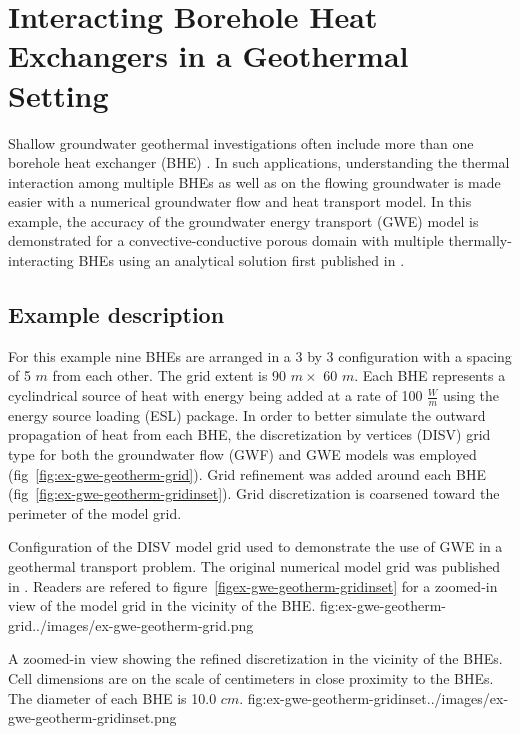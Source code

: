\section{Interacting Borehole Heat Exchangers in a Geothermal Setting}

Shallow groundwater geothermal investigations often include more than one borehole heat exchanger (BHE) \cite{hechtMendez2010}. In such applications, understanding the thermal interaction among multiple BHEs as well as on the flowing groundwater is made easier with a numerical groundwater flow and heat transport model.  In this example, the accuracy of the groundwater energy transport (GWE) model is demonstrated for a convective-conductive porous domain with multiple thermally-interacting BHEs using an analytical solution first published in \citep{alKhoury2021}.  

\subsection{Example description}

For this example nine BHEs are arranged in a 3 by 3 configuration with a spacing of 5 $m$ from each other. The grid extent is 90 $m \times$ 60 $m$.  Each BHE represents a cyclindrical source of heat with energy being added at a rate of 100 $\tfrac{W}{m}$ using the energy source loading (ESL) package. In order to better simulate the outward propagation of heat from each BHE, the discretization by vertices (DISV) grid type for both the groundwater flow (GWF) and GWE models was employed (fig~\ref{fig:ex-gwe-geotherm-grid}). Grid refinement was added around each BHE (fig~\ref{fig:ex-gwe-geotherm-gridinset}). Grid discretization is coarsened toward the perimeter of the model grid. 

\begin{StandardFigure}{
                                     Configuration of the DISV model grid used to demonstrate the use of GWE in a geothermal transport problem.  The original numerical model grid was published in \citep{alKhoury2021}.  Readers are refered to figure~\ref{figex-gwe-geotherm-gridinset} for a zoomed-in view of the model grid in the vicinity of the BHE.
                                     }{fig:ex-gwe-geotherm-grid}{../images/ex-gwe-geotherm-grid.png}
\end{StandardFigure}            

\begin{StandardFigure}{
                                     A zoomed-in view showing the refined discretization in the vicinity of the BHEs.  Cell dimensions are on the scale of centimeters in close proximity to the BHEs.  The diameter of each BHE is 10.0 $cm$.
                                     }{fig:ex-gwe-geotherm-gridinset}{../images/ex-gwe-geotherm-gridinset.png}
\end{StandardFigure}            

